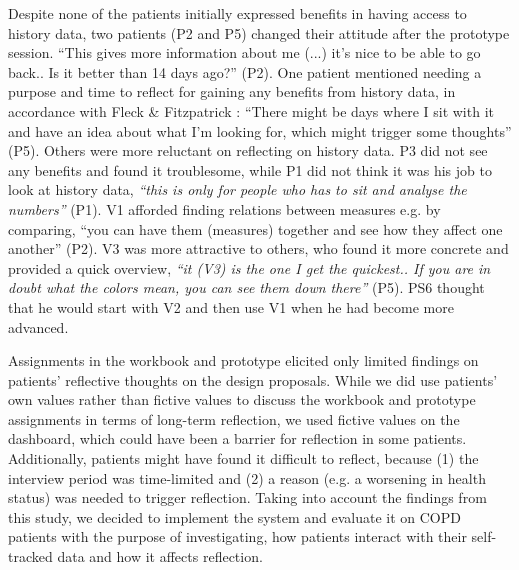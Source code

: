 Despite none of the patients initially expressed benefits in having access to history data, two patients (P2 and P5) changed their attitude after the prototype session. “This gives more information about me (...) it’s nice to be able to go back.. Is it better than 14 days ago?” (P2). One patient mentioned needing a purpose and time to reflect for gaining any benefits from history data, in accordance with Fleck \& Fitzpatrick \cite{Fleck}: “There might be days where I sit with it and have an idea about what I’m looking for, which might trigger some thoughts” (P5). Others were more reluctant on reflecting on history data. P3 did not see any benefits and found it troublesome, while P1 did not think it was his job to look at history data, \textit{“this is only for people who has to sit and analyse the numbers”} (P1). V1 afforded finding relations between measures e.g. by comparing, “you can have them (measures) together and see how they affect one another” (P2). V3 was more attractive to others, who found it more concrete and provided a quick overview, \textit{“it (V3) is the one I get the quickest.. If you are in doubt what the colors mean, you can see them down there”} (P5). PS6 thought that he would start with V2 and then use V1 when he had become more advanced. 

Assignments in the workbook and prototype elicited only limited findings on patients’ reflective thoughts on the design proposals. While we did use patients’ own values rather than fictive values to discuss the workbook and prototype assignments in terms of long-term reflection, we used fictive values on the dashboard, which could have been a barrier for reflection in some patients. Additionally, patients might have found it difficult to reflect, because (1) the interview period was time-limited and (2) a reason (e.g. a worsening in health status) was needed to trigger reflection. Taking into account the findings from this study, we decided to implement the system and evaluate it on COPD patients with the purpose of investigating, how patients interact with their self-tracked data and how it affects reflection. 